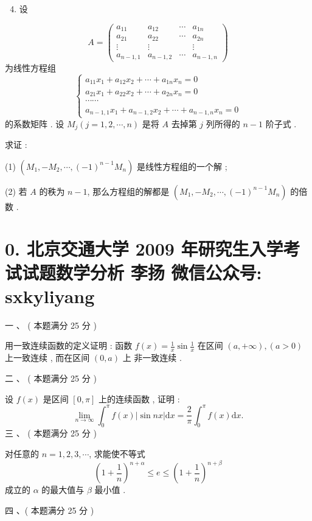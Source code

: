 \documentclass[10pt]{article}
\begin{document}
{\begin{enumerate}
  \setcounter{enumi}{3}
  \item  设 
\end{enumerate}
$$
A=\left(\begin{array}{cccc}
a_{11} & a_{12} & \cdots & a_{1 n} \\
a_{21} & a_{22} & \cdots & a_{2 n} \\
\vdots & \vdots & & \vdots \\
a_{n-1,1} & a_{n-1,2} & \cdots & a_{n-1, n}
\end{array}\right)
$$
 为线性方程组 
$$
\left\{\begin{array}{l}
a_{11} x_{1}+a_{12} x_{2}+\cdots+a_{1 n} x_{n}=0 \\
a_{21} x_{1}+a_{22} x_{2}+\cdots+a_{2 n} x_{n}=0 \\
\cdots \cdots \\
a_{n-1,1} x_{1}+a_{n-1,2} x_{2}+\cdots+a_{n-1, n} x_{n}=0
\end{array}\right.
$$
 的系数矩阵 .  设  $M_{j}(j=1,2, \cdots, n)$  是将  $A$  去掉第  $j$  列所得的  $n-1$  阶子式 .

 求证 :

(1) $\left(M_{1},-M_{2}, \cdots,(-1)^{n-1} M_{n}\right)$  是线性方程组的一个解 ;

(2)  若  $A$  的秩为  $n-1$,  那么方程组的解都是  $\left(M_{1},-M_{2}, \cdots,(-1)^{n-1} M_{n}\right)$  的倍数 .

\section{0. 北京交通大学 2009 年研究生入学考试试题数学分析 
 李扬 
 微信公众号: sxkyliyang}
 一 、 ( 本题满分  25  分 )

 用一致连续函数的定义证明 :  函数  $f(x)=\frac{1}{x} \sin \frac{1}{x}$  在区间  $(a,+\infty),(a>0)$  上一致连续 ,  而在区间  $(0, a)$  上   非一致连续 .

 二 、 ( 本题满分  25  分 )

 设  $f(x)$  是区间  $[0, \pi]$  上的连续函数 ,  证明 :
$$
\lim _{n \rightarrow \infty} \int_{0}^{\pi} f(x)|\sin n x| \mathrm{d} x=\frac{2}{\pi} \int_{0}^{\pi} f(x) \mathrm{d} x .
$$
 三 、 ( 本题满分  25  分 )

 对任意的  $n=1,2,3, \cdots$,  求能使不等式 
$$
\left(1+\frac{1}{n}\right)^{n+\alpha} \leqslant e \leqslant\left(1+\frac{1}{n}\right)^{n+\beta}
$$
 成立的  $\alpha$  的最大值与  $\beta$  最小值 .

 四 、( 本题满分  25  分 )

}
\end{document}
